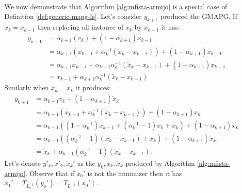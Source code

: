 \documentclass[12pt]{report}
\begin{document}
\begin{example}
\begin{algorithm}[H]
            \end{algorithm}
            We now demonstrate that Algorithm \ref{alg:mfista-armijo} is a special case of Definition \ref{def:generic-mapg-ls}.
            Let's consider $y_{k + 1}$ produced the GMAPG. 
            If $x_k = x_{k - 1}$ then replacing all instance of $x_k$ by $x_{k - 1}$ it has: 
            \begin{align*}
                y_{k + 1} &= \alpha_{k + 1}(v_k) + (1 - \alpha_{k + 1})x_{k - 1}
                \\
                &= \alpha_{k + 1}(x_{k - 1} + \alpha_k^{-1}(\tilde x_k - x_{k - 1})) + (1 - \alpha_{k + 1})x_{k - 1}
                \\
                &= \alpha_{k + 1} x_{k - 1} + \alpha_{k + 1}\alpha_k^{-1}(\tilde x_k - x_{k - 1}) + (1 - \alpha_{k + 1}) x_{k - 1}
                \\
                &= x_{k - 1} + \alpha_{k + 1}\alpha_k^{-1}(\tilde x_k - x_{k - 1})
            \end{align*}
            Similarly when $x_k = \tilde x_k$ it produces: 
            \begin{align*}
                y_{k + 1} &= 
                \alpha_{k + 1}v_k + (1 - \alpha_{k + 1})\tilde x_k
                \\
                &= 
                \alpha_{k + 1}(x_{k - 1} + \alpha_k^{-1}(\tilde x_k - x_{k - 1})) + (1 - \alpha_{k + 1})x_k
                \\
                &= 
                \alpha_{k + 1}\left(
                    (1 - \alpha_{k}^{-1})x_{k - 1} + (\alpha_k^{-1} - 1)\tilde x_k + \tilde x_k
                \right) + 
                (1 - \alpha_{k + 1})\tilde x_k
                \\
                &= 
                \alpha_{k + 1}\left(
                    (\alpha_k^{-1} - 1)(\tilde x_k - x_{k - 1}) + \tilde x_k
                \right) + 
                (1 - \alpha_{k + 1})\tilde x_k. 
                \\
                &= \tilde x_k + \alpha_{k + 1}(\alpha_k^{-1} - 1)(\tilde x_k - x_{k - 1}). 
            \end{align*}
            Let's denote $y'_{k}, x'_{k}, \tilde x_k'$ as the $y_k, x_k, \tilde x_k$ produced by Algorithm \ref{alg:mfista-armijo}.
            Observe that if $x_0'$ is not the minimizer then it has $\tilde x_1' = T_{L_0^{-1}}(y_0') = T_{L_0^{-1}}(x_0')$. 

\end{example}
\end{document}
